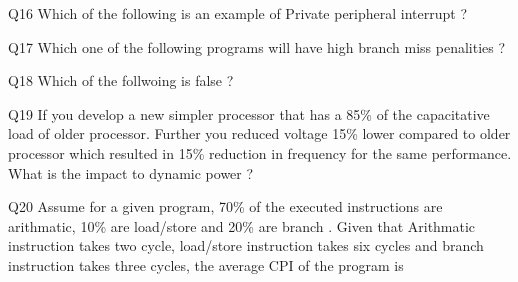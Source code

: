 \documentclass[a4paper]{article}
\begin{document}
{\begin{question}{Q16}
  Which of the following is an example of Private peripheral interrupt ? 
  \begin{choices}
  \end{choices}
\end{question}


\begin{question}{Q17}
  Which one of the following programs will have high branch miss penalities ? 
  \begin{choices}
  \end{choices}
\end{question}


\begin{question}{Q18}
  Which of the follwoing is false ? 
  \begin{choices}
  \end{choices}
\end{question}


\begin{question}{Q19}
  If you develop a new simpler processor that has a 85\% of the capacitative load of older processor. Further you reduced voltage 15\% lower compared to older processor which resulted in 15\% reduction in frequency for the same performance. What is the impact to dynamic power ?  
  \begin{choices}
  \end{choices}
\end{question}


\begin{question}{Q20}
  Assume for a given program, 70\% of the executed instructions are arithmatic, 10\% are load/store and 20\% are branch . Given that Arithmatic instruction takes two cycle, load/store instruction takes six cycles and branch instruction takes three cycles, the average CPI of the program is 
  \begin{choices}
  \end{choices}
\end{question}



\clearpage
}   
\end{document}
